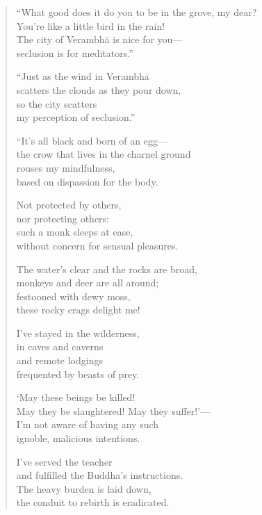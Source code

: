 \documentclass[12pt,openany]{book}%
\begin{document}
\begin{verse}%
“What good does it do you to be in the grove, my dear? \\
You’re like a little bird in the rain! \\
The city of \textsanskrit{Verambhā} is nice for you—\\
seclusion is for meditators.” 

“Just as the wind in \textsanskrit{Verambhā} \\
scatters the clouds as they pour down, \\
so the city scatters \\
my perception of seclusion.” 

“It’s all black and born of an egg—\\
the crow that lives in the charnel ground \\
rouses my mindfulness, \\
based on dispassion for the body. 

Not protected by others, \\
nor protecting others: \\
such a monk sleeps at ease, \\
without concern for sensual pleasures. 

The water’s clear and the rocks are broad, \\
monkeys and deer are all around; \\
festooned with dewy moss, \\
these rocky crags delight me! 

I’ve stayed in the wilderness, \\
in caves and caverns \\
and remote lodgings \\
frequented by beasts of prey. 

‘May these beings be killed! \\
May they be slaughtered! May they suffer!’—\\
I’m not aware of having any such \\
ignoble, malicious intentions. 

I’ve served the teacher \\
and fulfilled the Buddha’s instructions. \\
The heavy burden is laid down, \\
the conduit to rebirth is eradicated. 


\end{verse}
\end{document}
